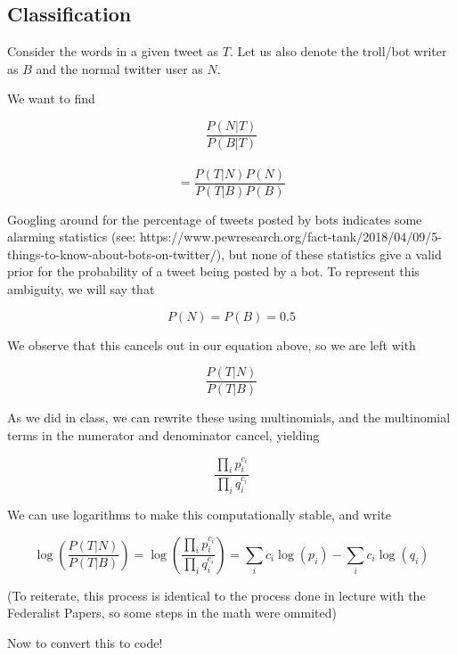 \documentclass[11pt]{article}
\begin{document}
    \hypertarget{classification}{%
\subsection{Classification}\label{classification}}

Consider the words in a given tweet as \(T\). Let us also denote the
troll/bot writer as \(B\) and the normal twitter user as \(N\).

We want to find

\[\frac{P(N|T)}{P(B|T)}\]\\
\[ = \frac{P(T|N)P(N)}{P(T|B)P(B)}\]

Googling around for the percentage of tweets posted by bots indicates
some alarming statistics (see:
https://www.pewresearch.org/fact-tank/2018/04/09/5-things-to-know-about-bots-on-twitter/),
but none of these statistics give a valid prior for the probability of a
tweet being posted by a bot. To represent this ambiguity, we will say
that

\[P(N) = P(B) = 0.5\]

We observe that this cancels out in our equation above, so we are left
with

\[\frac{P(T|N)}{P(T|B)}\]

As we did in class, we can rewrite these using multinomials, and the
multinomial terms in the numerator and denominator cancel, yielding

\[\frac{\prod_i p_{i}^{c_i}}{\prod_i q_{i}^{c_i}}\]

We can use logarithms to make this computationally stable, and write

\[\log(\frac{P(T|N)}{P(T|B)}) = \log(\frac{\prod_i p_{i}^{c_i}}{\prod_i q_{i}^{c_i}}) = \sum_i c_i\log(p_i) - \sum_i c_i \log(q_i)\]

(To reiterate, this process is identical to the process done in lecture
with the Federalist Papers, so some steps in the math were ommited)

Now to convert this to code!
\end{document}
